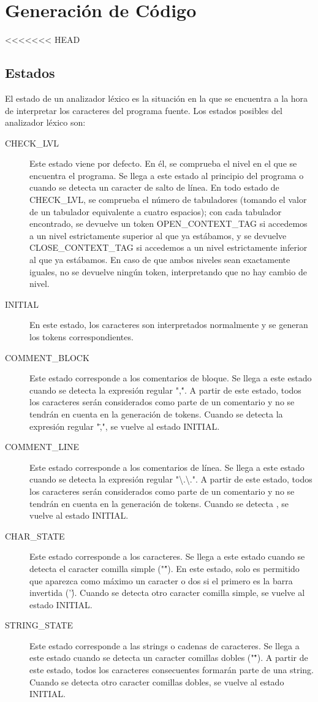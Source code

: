 \documentclass[11pt, english]{article}
\begin{document}
\newpage
\section{Generación de Código}

<<<<<<< HEAD
\subsection{Estados}\label{Estados}

El estado de un analizador léxico es la situación en la que se encuentra a la hora de interpretar los caracteres del programa fuente. Los estados posibles del analizador léxico son:

\begin{description}
	\item[CHECK\_LVL] Este estado viene por defecto. En él, se comprueba el nivel en el que se encuentra el programa. Se llega a este estado al principio del programa o cuando se detecta un caracter de salto de línea. En todo estado de CHECK\_LVL, se comprueba el número de tabuladores (tomando el valor de un tabulador equivalente a cuatro espacios); con cada tabulador encontrado, se devuelve un token OPEN\_CONTEXT\_TAG si accedemos a un nivel estrictamente superior al que ya estábamos, y se devuelve CLOSE\_CONTEXT\_TAG si accedemos a un nivel estrictamente inferior al que ya estábamos. En caso de que ambos niveles sean exactamente iguales, no se devuelve ningún token, interpretando que no hay cambio de nivel.
	\item[INITIAL] En este estado, los caracteres son interpretados normalmente y se generan los tokens correspondientes.
	\item[COMMENT\_BLOCK] Este estado corresponde a los comentarios de bloque. Se llega a este estado cuando se detecta la expresión regular ",\.". A partir de este estado, todos los caracteres serán considerados como parte de un comentario y no se tendrán en cuenta en la generación de tokens. Cuando se detecta la expresión regular "\.,", se vuelve al estado INITIAL.
	\item[COMMENT\_LINE] Este estado corresponde a los comentarios de línea. Se llega a este estado cuando se detecta la expresión regular "\textbackslash{}.\textbackslash{}.". A partir de este estado, todos los caracteres serán considerados como parte de un comentario y no se tendrán en cuenta en la generación de tokens. Cuando se detecta , se vuelve al estado INITIAL.
	\item[CHAR\_STATE] Este estado corresponde a los caracteres. Se llega a este estado cuando se detecta el caracter comilla simple ("\'"). En este estado, solo es permitido que aparezca como máximo un caracter o dos si el primero es la barra invertida ('\'). Cuando se detecta otro caracter comilla simple, se vuelve al estado INITIAL.
	\item[STRING\_STATE] Este estado corresponde a las strings o cadenas de caracteres. Se llega a este estado cuando se detecta un caracter comillas dobles ("\""). A partir de este estado, todos los caracteres consecuentes formarán parte de una string. Cuando se detecta otro caracter comillas dobles, se vuelve al estado INITIAL.
\end{description}
\end{document}

